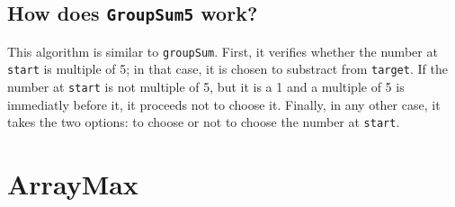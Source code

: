 \documentclass[a4paper,12pt]{article}
\begin{document}
    \subsection{How does \texttt{GroupSum5} work?}
    This algorithm is similar to \texttt{groupSum}. First, it verifies whether the number at \texttt{start} is multiple of 5; in
that case, it is chosen to substract from \texttt{target}. If the number at \texttt{start} is not multiple of 5, but it is a
1 and a multiple of 5 is immediatly before it, it proceeds not to choose it. Finally, in any other case, it
takes the two options: to choose or not to choose the number at \texttt{start}.


    \newpage
    \section{ArrayMax}
    \begin{figure}[ht]
      \begin{floatrow}
      \end{floatrow}
    \end{figure}
\end{document}
